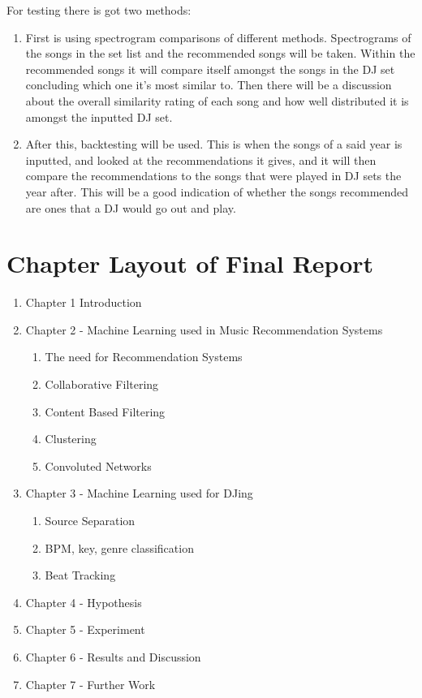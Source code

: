 \documentclass[11pt,titlepage,oneside]{book}
\begin{document}
\begin{flushleft}
	For testing there is got two methods: 
\end{flushleft}
\begin{enumerate}
	\item First is using spectrogram comparisons of different methods. Spectrograms of the songs in the set list and the recommended songs will be taken. Within the recommended songs it will compare itself amongst the songs in the DJ set concluding which one it’s most similar to. Then there will be a discussion about the overall similarity rating of each song and how well distributed it is amongst the inputted DJ set.
	\item After this, backtesting will be used. This is when the songs of a said year is inputted, and looked at the recommendations it gives, and it will then compare the recommendations to the songs that were played in DJ sets the year after. This will be a good indication of whether the songs recommended are ones that a DJ would go out and play.
\end{enumerate}

\section{Chapter Layout of Final Report}
\begin{enumerate}
	\item Chapter 1 Introduction
	\item Chapter 2 - Machine Learning used in Music Recommendation Systems
	\begin{enumerate}
		\item The need for Recommendation Systems
		\item Collaborative Filtering
		\item Content Based Filtering
		\item Clustering
		\item Convoluted Networks
	\end{enumerate}
	\item Chapter 3 - Machine Learning used for DJing
	\begin{enumerate}
		\item Source Separation
		\item BPM, key, genre classification
		\item Beat Tracking 
	\end{enumerate}
	\item Chapter 4 - Hypothesis
	\item Chapter 5 - Experiment
	\item Chapter 6 - Results and Discussion
	\item Chapter 7 - Further Work
	
\end{enumerate}


\end{document}
